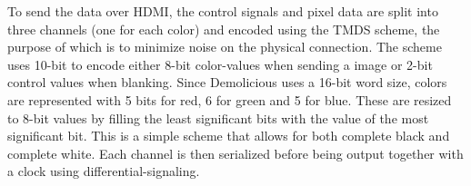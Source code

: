 \documentclass[../main/report.tex]{subfiles}
\begin{document}
To send the data over HDMI, the control signals and pixel data are split into three channels (one for each color) and encoded using the TMDS scheme, the purpose of which is to minimize noise on the physical connection.
The scheme uses 10-bit to encode either 8-bit color-values when sending a image or 2-bit control values when blanking.
Since Demolicious uses a 16-bit word size, colors are represented with 5 bits for red, 6 for green and 5 for blue.
These are resized to 8-bit values by filling the least significant bits with the value of the most significant bit.
This is a simple scheme that allows for both complete black and complete white.
Each channel is then serialized before being output together with a clock using differential-signaling.
\end{document}
